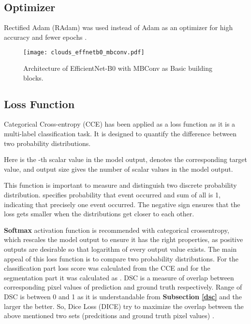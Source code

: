 \documentclass[conference]{IEEEtran}
\begin{document}
\subsection{Optimizer}  
Rectified Adam (RAdam) was used instead of Adam as an optimizer for high accuracy and fewer epochs \cite{liu2019variance}.   


\begin{figure}[h!]
    \centering
    \texttt{[image: clouds\_effnetb0\_mbconv.pdf]}
    \caption{Architecture of EfficientNet-B0 with MBConv as Basic building blocks.}
    \label{mbconv}
\end{figure}




\subsection{Loss Function}
Categorical Cross-entropy (CCE) has been applied as a loss function as it is a multi-label classification task. It is designed to quantify the difference between two probability distributions.

Here  is the -th scalar value in the model output,  denotes the corresponding target value, and output size gives the number of scalar values in the model output.

This function is important to measure and distinguish two discrete probability distribution.  specifies probability that event  occurred and sum of all  is 1, indicating that precisely one event occurred. The negative sign ensures that the loss gets smaller when the distributions get closer to each other.

\textbf{Softmax} activation function is recommended with categorical crossentropy, which rescales the model output to ensure it has the right properties, as positive outputs are desirable so that logarithm of every output value  exists. The main appeal of this loss function is to compare two probability distributions. For the classification part loss score was calculated from the CCE and for the segmentation part it was calculated as .
DSC is a measure of overlap between corresponding pixel values of prediction and ground truth respectively. Range of DSC is between 0 and 1 as it is understandable from \textbf{Subsection \ref{dsc}} and the larger the better. So, Dice Loss (DICE) try to maximize the overlap between the above mentioned two sets (predcitions and ground truth pixel values) \cite{sudre2017generalised}.
\end{document}
